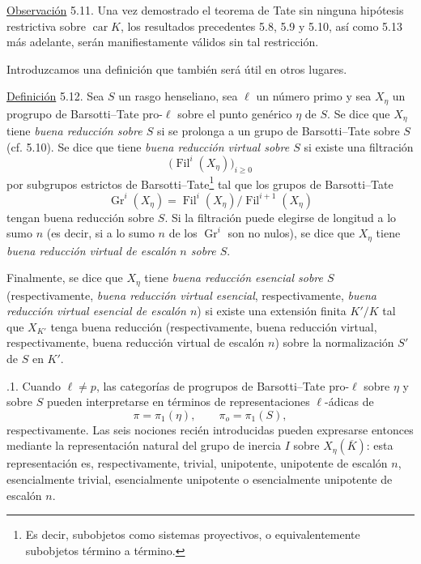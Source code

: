 
\medskip
\noindent
\underline{Observación} 5.11. Una vez demostrado el teorema de Tate
sin ninguna hipótesis restrictiva sobre $\operatorname{car}K$, los
resultados precedentes 5.8, 5.9 y 5.10, así como 5.13 más adelante,
serán manifiestamente válidos sin tal restricción.

Introduzcamos una definición que también será útil en otros lugares.

\medskip
\noindent
\underline{Definición} 5.12. Sea $S$ un rasgo henseliano, sea $\ell$
un número primo y sea $X_\eta$ un progrupo de Barsotti--Tate
pro-$\ell$ sobre el punto genérico $\eta$ de $S$. Se dice que
$X_\eta$ tiene \emph{buena reducción sobre $S$} si se prolonga a un
grupo de Barsotti--Tate sobre $S$ (cf. 5.10). Se dice que tiene
\emph{buena reducción virtual sobre $S$} si existe una filtración
\[
 \bigl(\operatorname{Fil}^i(X_\eta)\bigr)_{i\geq0}
\]
por subgrupos estrictos de Barsotti--Tate\footnote{Es decir,
subobjetos como sistemas proyectivos, o equivalentemente subobjetos
término a término.} tal que los grupos de Barsotti--Tate
\[
 \operatorname{Gr}^i(X_\eta)=
 \operatorname{Fil}^i(X_\eta)/\operatorname{Fil}^{i+1}(X_\eta)
\]
tengan buena reducción sobre $S$. Si la filtración puede elegirse de
longitud a lo sumo $n$ (es decir, si a lo sumo $n$ de los
$\operatorname{Gr}^i$ son no nulos), se dice que $X_\eta$ tiene
\emph{buena reducción virtual de escalón $n$ sobre $S$}.


Finalmente, se dice que $X_\eta$ tiene \emph{buena reducción esencial
sobre $S$} (respectivamente, \emph{buena reducción virtual esencial},
respectivamente, \emph{buena reducción virtual esencial de escalón
$n$}) si existe una extensión finita $K'/K$ tal que $X_{K'}$ tenga
buena reducción (respectivamente, buena reducción virtual,
respectivamente, buena reducción virtual de escalón $n$) sobre la
normalización $S'$ de $S$ en $K'$.

\medskip
{}.1. Cuando $\ell\neq p$, las categorías de progrupos de
Barsotti--Tate pro-$\ell$ sobre $\eta$ y sobre $S$ pueden interpretarse
en términos de representaciones $\ell$-ádicas de
\[
 \pi=\pi_1(\eta), \qquad \pi_o=\pi_1(S),
\]
respectivamente. Las seis nociones recién introducidas pueden
expresarse entonces mediante la representación natural del grupo de
inercia $I$ sobre $X_\eta(\overline K)$: esta representación es,
respectivamente, trivial, unipotente, unipotente de escalón $n$,
esencialmente trivial, esencialmente unipotente o esencialmente
unipotente de escalón $n$.

